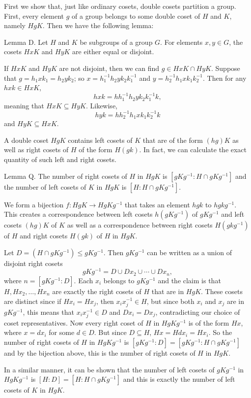 First we show that, just like ordinary cosets, double cosets partition a group. First, every element $g$ of a group belongs to some double coset of $H$ and $K$, namely $HgK$. Then we have the following lemma:

\proclaim Lemma D. Let $H$ and $K$ be subgroups of a group $G$. For elements $x,y\in G$, the cosets $HxK$ and $HyK$ are either equal or disjoint.

\proof If $HxK$ and $HyK$ are not disjoint, then we can find $g\in HxK \cap HyK$. Suppose that $g = h_1xk_1 = h_2yk_2$; so $x = h_1^{-1}h_2yk_2k_1^{-1}$ and $y = h_2^{-1}h_1xk_1k_2^{-1}$. Then for any $hxk\in HxK$,
$$hxk = hh_1^{-1}h_2yk_2k_1^{-1}k,$$
meaning that $HxK\subseteq HyK$. Likewise,
$$hyk = hh_2^{-1}h_1xk_1k_2^{-1}k$$
and $HyK\subseteq HxK$.\slug

A double coset $HgK$ contains left cosets of $K$ that are of the form $(hg)K$ as well as right cosets of $H$ of the form $H(gk)$. In fact, we can calculate the exact quantity of such left and right cosets.

\proclaim Lemma Q. The number of right cosets of $H$ in $HgK$ is $[gKg^{-1} : H\cap gKg^{-1}]$ and the number of left cosets of $K$ in $HgK$ is $[H : H\cap gKg^{-1}]$.

\proof We form a bijection $f:HgK\rightarrow HgKg^{-1}$ that takes an element $hgk$ to $hgkg^{-1}$. This creates a correspondence between left cosets $h(gKg^{-1})$ of $gKg^{-1}$ and left cosets $(hg)K$ of $K$ as well as a correspondence between right cosets $H(gkg^{-1})$ of $H$ and right cosets $H(gk)$ of $H$ in $HgK$.

Let $D = (H\cap gKg^{-1}) \leq gKg^{-1}$. Then $gKg^{-1}$ can be written as a union of disjoint right cosets
$$gKg^{-1} = D \cup Dx_2 \cup \cdots \cup Dx_n,$$
where $n = [gKg^{-1} : D]$. Each $x_i$ belongs to $gKg^{-1}$ and the claim is that $H, Hx_2, \ldots, Hx_n$ are exactly the right cosets of $H$ that are in $HgK$. These cosets are distinct since if $Hx_i = Hx_j$, then $x_ix_j^{-1}\in H$, but since both $x_i$ and $x_j$ are in $gKg^{-1}$, this means that $x_ix_j^{-1}\in D$ and $Dx_i = Dx_j$, contradicting our choice of coset representatives. Now every right coset of $H$ in $HgKg^{-1}$ is of the form $Hx$, where $x = dx_i$ for some $d\in D$. But since $D\subseteq H$, $Hx = Hdx_i = Hx_i$. So the number of right cosets of $H$ in $HgKg^{-1}$ is $[gKg^{-1} :  D] = [gKg^{-1} : H\cap gKg^{-1}]$ and by the bijection above, this is the number of right cosets of $H$ in $HgK$.

In a similar manner, it can be shown that the number of left cosets of $gKg^{-1}$ in $HgKg^{-1}$ is $[H:D] = [H:H\cap gKg^{-1}]$ and this is exactly the number of left cosets of $K$ in $HgK$.\slug

